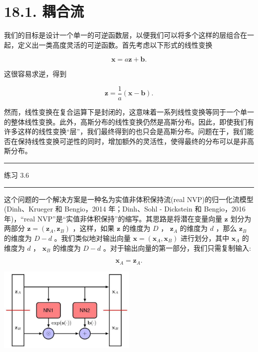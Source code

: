 \documentclass[10pt]{article}
\newcommand{\HRule}{\begin{center}\rule{0.9\linewidth}{0.2mm}\end{center}}
\begin{document}
\section*{18.1. 耦合流}

我们的目标是设计一个单一的可逆函数层，以便我们可以将多个这样的层组合在一起，定义出一类高度灵活的可逆函数。首先考虑以下形式的线性变换

\[
\mathbf{x} = a\mathbf{z} + \mathbf{b}. \tag{18.8}
\]

这很容易求逆，得到

\[
\mathbf{z} = \frac{1}{a}\left( {\mathbf{x} - \mathbf{b}}\right) . \tag{18.9}
\]

然而，线性变换在复合运算下是封闭的，这意味着一系列线性变换等同于一个单一的整体线性变换。此外，高斯分布的线性变换仍然是高斯分布。因此，即使我们有许多这样的线性变换“层”，我们最终得到的也只会是高斯分布。问题在于，我们能否在保持线性变换可逆性的同时，增加额外的灵活性，使得最终的分布可以是非高斯分布。

\HRule

练习 3.6

\HRule

这个问题的一个解决方案是一种名为实值非体积保持流(real NVP)的归一化流模型(Dinh、Krueger 和 Bengio，2014 年；Dinh、Sohl - Dickstein 和 Bengio，2016 年)，“real NVP”是“实值非体积保持”的缩写。其思路是将潜在变量向量 \(\mathbf{z}\) 划分为两部分 \(\mathbf{z} = \left( {{\mathbf{z}}_{A},{\mathbf{z}}_{B}}\right)\) ，这样，如果 \(\mathbf{z}\) 的维度为 \(D\) ， \({\mathbf{z}}_{A}\) 的维度为 \(d\) ，那么 \({\mathbf{z}}_{B}\) 的维度为 \(D - d\) 。我们类似地对输出向量 \(\mathbf{x} = \left( {{\mathbf{x}}_{A},{\mathbf{x}}_{B}}\right)\) 进行划分，其中 \({\mathbf{x}}_{A}\) 的维度为 \(d\) ， \({\mathbf{x}}_{B}\) 的维度为 \(D - d\) 。对于输出向量的第一部分，我们只需复制输入:

\[
{\mathbf{x}}_{A} = {\mathbf{z}}_{A}. \tag{18.10}
\]

\begin{center}
\includegraphics[max width=0.5\textwidth]{images/0194e279-9b28-703a-88f4-c3ac21e2010d_569_836_343_664_407_0.jpg}
\end{center}
\hspace*{3em} 
\end{document}
